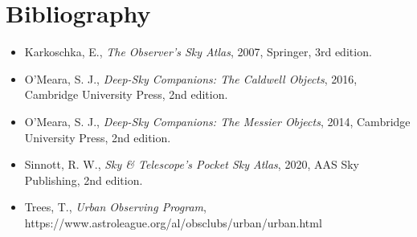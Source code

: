 \chapter*{Bibliography}

\begin{itemize}

\item[] Karkoschka, E., \emph{The Observer’s Sky Atlas},  2007, Springer, 3rd edition.

\item[] O’Meara, S. J., \emph{Deep-Sky Companions: The Caldwell Objects},  2016, Cambridge University Press, 2nd edition.

\item[] O’Meara, S. J., \emph{Deep-Sky Companions: The Messier Objects},  2014, Cambridge University Press, 2nd edition.

\item[] Sinnott, R. W., \emph{Sky \& Telescope’s Pocket Sky Atlas}, 2020, AAS Sky Publishing, 2nd edition.

\item[] Trees, T., \emph{Urban Observing Program}, \\
https://www.astroleague.org/al/obsclubs/urban/urban.html

\end{itemize}
